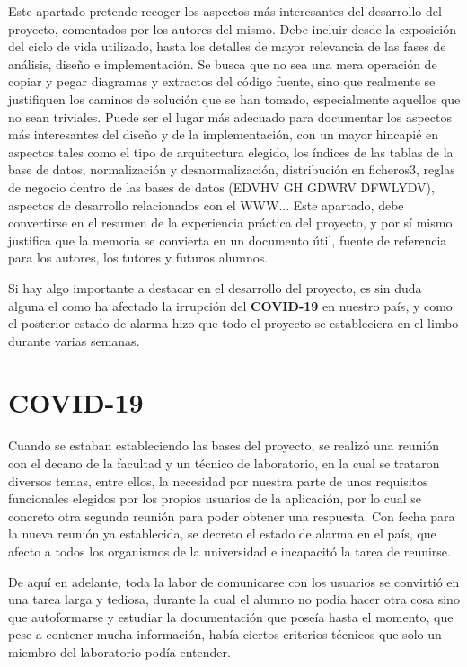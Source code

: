 
Este apartado pretende recoger los aspectos más interesantes del desarrollo del proyecto, comentados por los autores del mismo.
Debe incluir desde la exposición del ciclo de vida utilizado, hasta los detalles de mayor relevancia de las fases de análisis, diseño e implementación.
Se busca que no sea una mera operación de copiar y pegar diagramas y extractos del código fuente, sino que realmente se justifiquen los caminos de solución que se han tomado, especialmente aquellos que no sean triviales.
Puede ser el lugar más adecuado para documentar los aspectos más interesantes del diseño y de la implementación, con un mayor hincapié en aspectos tales como el tipo de arquitectura elegido, los índices de las tablas de la base de datos, normalización y desnormalización, distribución en ficheros3, reglas de negocio dentro de las bases de datos (EDVHV GH GDWRV DFWLYDV), aspectos de desarrollo relacionados con el WWW...
Este apartado, debe convertirse en el resumen de la experiencia práctica del proyecto, y por sí mismo justifica que la memoria se convierta en un documento útil, fuente de referencia para los autores, los tutores y futuros alumnos.

Si hay algo importante a destacar en el desarrollo del proyecto, es sin duda alguna el como ha afectado la irrupción del \textbf{COVID-19} en nuestro país, y como el posterior estado de alarma hizo que todo el proyecto se estableciera en el limbo durante varias semanas.

\section{COVID-19}

Cuando se estaban estableciendo las bases del proyecto, se realizó una reunión con el decano de la facultad y un técnico de laboratorio, en la cual se trataron diversos temas, entre ellos, la necesidad por nuestra parte de unos requisitos funcionales elegidos por los propios usuarios de la aplicación, por lo cual se concreto otra segunda reunión para poder obtener una respuesta. Con fecha para la nueva reunión ya establecida, se decreto el estado de alarma en el país, que afecto a todos los organismos de la universidad e incapacitó la tarea de reunirse. 

De aquí en adelante, toda la labor de comunicarse con los usuarios se convirtió en una tarea larga y tediosa, durante la cual el alumno no podía hacer otra cosa sino que autoformarse y estudiar la documentación que poseía hasta el momento, que pese a contener mucha información, había ciertos criterios técnicos que solo un miembro del laboratorio podía entender.

